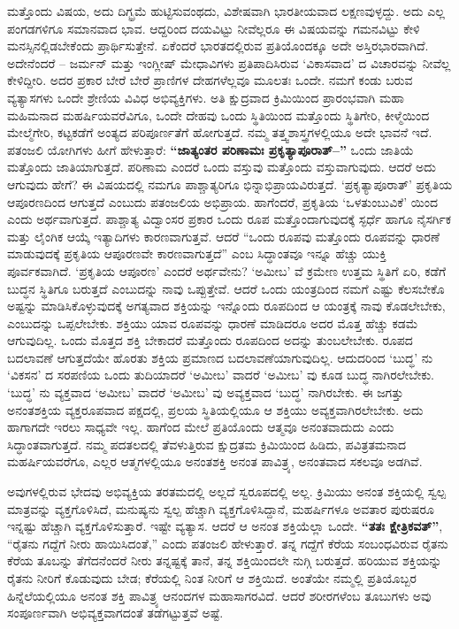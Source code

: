 ಮತ್ತೊಂದು ವಿಷಯ, ಅದು ದಿಗ್ಭ್ರಮೆ ಹುಟ್ಟಿಸುವಂಥದು, ವಿಶೇಷವಾಗಿ ಭಾರತೀಯವಾದ ಲಕ್ಷಣವುಳ್ಳದ್ದು. ಅದು ಎಲ್ಲ ಪಂಗಡಗಳಿಗೂ ಸಮಾನವಾದ ಭಾವ. ಆದ್ದರಿಂದ ದಯವಿಟ್ಟು ನೀವೆಲ್ಲರೂ ಈ ವಿಷಯವನ್ನು ಗಮನವಿಟ್ಟು ಕೇಳಿ ಮನಸ್ಸಿನಲ್ಲಿಡಬೇಕೆಂದು ಪ್ರಾರ್ಥಿಸುತ್ತೇನೆ. ಏಕೆಂದರೆ ಭಾರತದಲ್ಲಿರುವ ಪ್ರತಿಯೊಂದಕ್ಕೂ ಅದೇ ಅಸ್ತಿರಭಾರವಾಗಿದೆ. ಅದೇನೆಂದರೆ – ಜರ್ಮನ್​ ಮತ್ತು ಇಂಗ್ಲೀಷ್​ ಮೇಧಾವಿಗಳು ಪ್ರತಿಪಾದಿಸಿರುವ ‘ವಿಕಾಸವಾದ’ ದ ವಿಚಾರವನ್ನು ನೀವೆಲ್ಲ ಕೇಳಿದ್ದೀರಿ. ಅದರ ಪ್ರಕಾರ ಬೇರೆ ಬೇರೆ ಪ್ರಾಣಿಗಳ ದೇಹಗಳೆಲ್ಲವೂ ಮೂಲತಃ ಒಂದೇ. ನಮಗೆ ಕಂಡು ಬರುವ ವ್ಯತ್ಯಾಸಗಳು ಒಂದೇ ಶ್ರೇಣಿಯ ವಿವಿಧ ಅಭಿವ್ಯಕ್ತಿಗಳು. ಅತಿ ಕ್ಷುದ್ರವಾದ ಕ್ರಿಮಿಯಿಂದ ಪ್ರಾರಂಭವಾಗಿ ಮಹಾ ಮಹಿಮನಾದ ಮಹರ್ಷಿಯವರೆವಿಗೂ, ಒಂದೇ ದೇಹವು ಒಂದು ಸ್ಥಿತಿಯಿಂದ ಮತ್ತೊಂದು ಸ್ಥಿತಿಗೇರಿ, ಕೀಳ್ಮೆಯಿಂದ ಮೇಲ್ಮೆಗೇರಿ, ಕಟ್ಟಕಡೆಗೆ ಅಂತ್ಯದ ಪರಿಪೂರ್ಣತೆಗೆ ಹೋಗುತ್ತದೆ. ನಮ್ಮ ತತ್ತ್ವಶಾಸ್ತ್ರಗಳಲ್ಲಿಯೂ ಅದೇ ಭಾವನೆ ಇದೆ. ಪತಂಜಲಿ ಯೋಗಿಗಳು ಹೀಗೆ ಹೇಳುತ್ತಾರೆ: \textbf{“ಜಾತ್ಯಂತರ ಪರಿಣಾಮಃ ಪ್ರಕೃತ್ಯಾಪೂರಾತ್​–”} ಒಂದು ಜಾತಿಯೆ ಮತ್ತೊಂದು ಜಾತಿಯಾಗುತ್ತದೆ. ಪರಿಣಾಮ ಎಂದರೆ ಒಂದು ವಸ್ತುವು ಮತ್ತೊಂದು ವಸ್ತುವಾಗುವುದು. ಆದರೆ ಅದು ಆಗುವುದು ಹೇಗೆ? ಈ ವಿಷಯದಲ್ಲಿ ನಮಗೂ ಪಾಶ್ಚಾತ್ಯರಿಗೂ ಭಿನ್ನಾಭಿಪ್ರಾಯವಿರುತ್ತದೆ. ‘ಪ್ರಕೃತ್ಯಾಪೂರಾತ್​’ ಪ್ರಕೃತಿಯ ಆಪೂರಣದಿಂದ ಆಗುತ್ತದೆ ಎಂಬುದು ಪತಂಜಲಿಯ ಅಭಿಪ್ರಾಯ. ಹಾಗೆಂದರೆ, ಪ್ರಕೃತಿಯ ‘ಒಳತುಂಬುವಿಕೆ’ ಯಿಂದ ಎಂದು ಅರ್ಥವಾಗುತ್ತದೆ. ಪಾಶ್ಚಾತ್ಯ ವಿದ್ವಾಂಸರ ಪ್ರಕಾರ ಒಂದು ರೂಪ ಮತ್ತೊಂದಾಗುವುದಕ್ಕೆ ಸ್ಫರ್ಧೆ ಹಾಗೂ ನೈಸರ್ಗಿಕ ಮತ್ತು ಲೈಂಗಿಕ ಆಯ್ಕೆ ಇತ್ಯಾದಿಗಳು  ಕಾರಣವಾಗುತ್ತವೆ. ಆದರೆ “ಒಂದು ರೂಪವು ಮತ್ತೊಂದು ರೂಪವನ್ನು ಧಾರಣೆ ಮಾಡುವುದಕ್ಕೆ ಪ್ರಕೃತಿಯ ಆಪೂರಣವೇ ಕಾರಣವಾಗುತ್ತದೆ” ಎಂಬ ಸಿದ್ಧಾಂತವೂ ಇನ್ನೂ ಹೆಚ್ಚು ಯುಕ್ತಿ ಪೂರ್ವಕವಾಗಿದೆ. ‘ಪ್ರಕೃತಿಯ ಆಪೂರಣ’ ಎಂದರೆ ಅರ್ಥವೇನು? ‘ಅಮೀಬ’ ವೆ  ಕ್ರಮೇಣ ಉತ್ತಮ ಸ್ಥಿತಿಗೆ ಏರಿ, ಕಡೆಗೆ ಬುದ್ಧನ ಸ್ಥಿತಿಗೂ ಬರುತ್ತದೆ ಎಂಬುದನ್ನು ನಾವು ಒಪ್ಪುತ್ತೇವೆ. ಆದರೆ ಒಂದು ಯಂತ್ರದಿಂದ ನಮಗೆ ಎಷ್ಟು ಕೆಲಸಬೇಕೊ ಅಷ್ಟನ್ನು ಮಾಡಿಸಿಕೊಳ್ಳುವುದಕ್ಕೆ ಅಗತ್ಯವಾದ ಶಕ್ತಿಯನ್ನು ಇನ್ನೊಂದು ರೂಪದಿಂದ ಆ ಯಂತ್ರಕ್ಕೆ ನಾವು ಕೊಡಲೇಬೇಕು, ಎಂಬುದನ್ನು ಒಪ್ಪಲೇಬೇಕು. ಶಕ್ತಿಯು ಯಾವ ರೂಪವನ್ನು ಧಾರಣೆ ಮಾಡಿದರೂ ಅದರ ಮೊತ್ತ ಹೆಚ್ಚು ಕಡಮೆ ಆಗುವುದಿಲ್ಲ. ಒಂದು ಮೊತ್ತದ ಶಕ್ತಿ ಬೇಕಾದರೆ ಮತ್ತೊಂದು ರೂಪದಿಂದ ಅದನ್ನು ತುಂಬಲೇಬೇಕು. ರೂಪದ ಬದಲಾವಣೆ ಆಗುತ್ತದೆಯೇ ಹೊರತು ಶಕ್ತಿಯ ಪ್ರಮಾಣದ ಬದಲಾವಣೆಯಾಗುವುದಿಲ್ಲ. ಆದುದರಿಂದ ‘ಬುದ್ಧ’ ನು ‘ವಿಕಸನ’ ದ ಸರಪಣಿಯ ಒಂದು ತುದಿಯಾದರೆ ‘ಅಮೀಬ’ ವಾದರೆ ‘ಅಮೀಬ’ ವು ಕೂಡ ಬುದ್ಧ ನಾಗಿರಲೇಬೇಕು. ‘ಬುದ್ಧ’ ನು ವ್ಯಕ್ತವಾದ ‘ಅಮೀಬ’ ವಾದರೆ ‘ಅಮೀಬ’ ವು ಅವ್ಯಕ್ತವಾದ ‘ಬುದ್ಧ’ ನಾಗಿರಬೇಕು. ಈ ಜಗತ್ತು ಅನಂತಶಕ್ತಿಯ ವ್ಯಕ್ತರೂಪವಾದ ಪಕ್ಷದಲ್ಲಿ, ಪ್ರಲಯ ಸ್ಥಿತಿಯಲ್ಲಿಯೂ ಆ ಶಕ್ತಿಯು ಅವ್ಯಕ್ತವಾಗಿರಲೇಬೇಕು. ಅದು ಹಾಗಾಗದೇ ಇರಲು ಸಾಧ್ಯವೇ ಇಲ್ಲ. ಹಾಗೆಂದ ಮೇಲೆ ಪ್ರತಿಯೊಂದು ಆತ್ಮವೂ ಅನಂತವಾದುದು ಎಂದು ಸಿದ್ಧಾಂತವಾಗುತ್ತದೆ. ನಮ್ಮ ಪದತಲದಲ್ಲಿ ತೆವಳುತ್ತಿರುವ ಕ್ಷುದ್ರತಮ ಕ್ರಿಮಿಯಿಂದ ಹಿಡಿದು, ಪವಿತ್ರತಮನಾದ ಮಹರ್ಷಿಯವರೆಗೂ, ಎಲ್ಲರ ಆತ್ಮಗಳಲ್ಲಿಯೂ ಅನಂತಶಕ್ತಿ ಅನಂತ ಪಾವಿತ್ರ್ಯ, ಅನಂತವಾದ ಸಕಲವೂ ಅಡಗಿವೆ.

ಅವುಗಳಲ್ಲಿರುವ ಭೇದವು ಅಭಿವ್ಯಕ್ತಿಯ ತರತಮದಲ್ಲಿ ಅಲ್ಲದೆ ಸ್ವರೂಪದಲ್ಲಿ ಅಲ್ಲ. ಕ್ರಿಮಿಯು ಅನಂತ ಶಕ್ತಿಯಲ್ಲಿ ಸ್ವಲ್ಪ ಮಾತ್ರವನ್ನು ವ್ಯಕ್ತಗೊಳಿಸಿದೆ, ಮನುಷ್ಯನು ಸ್ವಲ್ಪ ಹೆಚ್ಚಾಗಿ ವ್ಯಕ್ತಗೊಳಿಸಿದ್ದಾನೆ, ಮಹರ್ಷಿಗಳೂ ಅವತಾರ ಪುರುಷರೂ ಇನ್ನಷ್ಟು ಹೆಚ್ಚಾಗಿ ವ್ಯಕ್ತಗೊಳಿಸುತ್ತಾರೆ. ಇಷ್ಟೇ ವ್ಯತ್ಯಾಸ. ಆದರೆ ಆ ಅನಂತ ಶಕ್ತಿಯೆಲ್ಲಾ ಒಂದೇ. \textbf{“ತತಃ ಕ್ಷೇತ್ರಿಕವತ್​”}, “ರೈತನು ಗದ್ದೆಗೆ ನೀರು ಹಾಯಿಸಿದಂತೆ,” ಎಂದು ಪತಂಜಲಿ ಹೇಳುತ್ತಾರೆ. ತನ್ನ ಗದ್ದೆಗೆ ಕೆರೆಯ ಸಂಬಂಧವಿರುವ ರೈತನು ಕೆರೆಯ ತೂಬನ್ನು ತೆಗೆದನೆಂದರೆ ನೀರು ತನ್ನಷ್ಟಕ್ಕೆ ತಾನೆ, ತನ್ನ ಶಕ್ತಿಯಿಂದಲೇ ನುಗ್ಗಿ ಬರುತ್ತದೆ. ಹರಿಯುವ ಶಕ್ತಿಯನ್ನು ರೈತನು ನೀರಿಗೆ ಕೊಡುವುದು ಬೇಡ; ಕೆರೆಯಲ್ಲಿ ನಿಂತ ನೀರಿಗೆ ಆ ಶಕ್ತಿಯಿದೆ. ಅಂತೆಯೇ ನಮ್ಮಲ್ಲಿ ಪ್ರತಿಯೊಬ್ಬರ ಹಿನ್ನೆಲೆಯಲ್ಲಿಯೂ ಅನಂತ ಶಕ್ತಿ ಪಾವಿತ್ರ್ಯ ಆನಂದಗಳ ಮಹಾಸಾಗರವಿದೆ. ಆದರೆ ಶರೀರಗಳೆಂಬ ತೂಬುಗಳು ಅವು ಸಂಪೂರ್ಣವಾಗಿ ಅಭಿವ್ಯಕ್ತವಾಗದಂತೆ ತಡೆಗಟ್ಟುತ್ತವೆ ಅಷ್ಟೆ.

